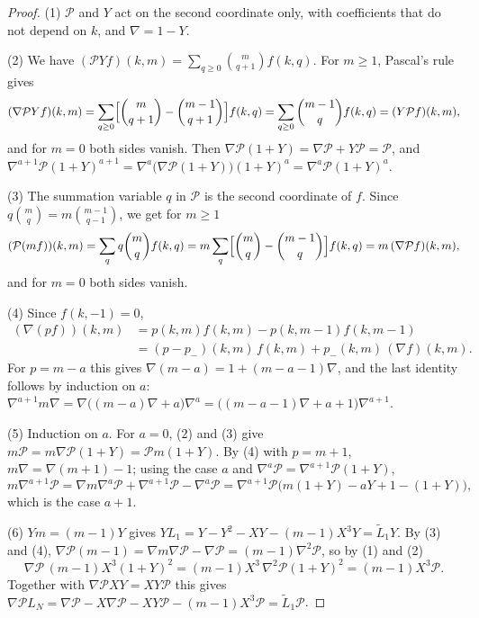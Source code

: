 \documentclass[11pt]{amsart}
\theoremstyle{definition}
\begin{document}
\begin{proof}
(1) $\mathcal P$ and $Y$ act on the second coordinate only, with coefficients that do not depend on $k$, and $\nabla=1-Y$.

(2) We have $(\mathcal PYf)(k,m)=\sum_{q\ge0}\binom{m}{q+1}f(k,q)$. For $m\ge1$, Pascal's rule gives
\[
  (\nabla\mathcal PYf)(k,m)=\sum_{q\ge0}\Bigl[\binom{m}{q+1}-\binom{m-1}{q+1}\Bigr]f(k,q)=\sum_{q\ge0}\binom{m-1}{q}f(k,q)=(Y\mathcal Pf)(k,m),
\]
and for $m=0$ both sides vanish. Then $\nabla\mathcal P(1+Y)=\nabla\mathcal P+Y\mathcal P=\mathcal P$, and $\nabla^{a+1}\mathcal P(1+Y)^{a+1}=\nabla^a\bigl(\nabla\mathcal P(1+Y)\bigr)(1+Y)^a=\nabla^a\mathcal P(1+Y)^a$.

(3) The summation variable $q$ in $\mathcal P$ is the second coordinate of $f$. Since $q\binom{m}{q}=m\binom{m-1}{q-1}$, we get for $m\ge1$
\[
  (\mathcal P(mf))(k,m)=\sum_qq\binom{m}{q}f(k,q)=m\sum_q\Bigl[\binom{m}{q}-\binom{m-1}{q}\Bigr]f(k,q)=m\,(\nabla\mathcal Pf)(k,m),
\]
and for $m=0$ both sides vanish.

(4) Since $f(k,-1)=0$,
\begin{align*}
  (\nabla(pf))(k,m)&=p(k,m)f(k,m)-p(k,m-1)f(k,m-1)\\
  &=(p-p_-)(k,m)\,f(k,m)+p_-(k,m)\,(\nabla f)(k,m).
\end{align*}
For $p=m-a$ this gives $\nabla(m-a)=1+(m-a-1)\nabla$, and the last identity follows by induction on $a$: $\nabla^{a+1}m\nabla=\nabla\bigl((m-a)\nabla+a\bigr)\nabla^a=\bigl((m-a-1)\nabla+a+1\bigr)\nabla^{a+1}$.

(5) Induction on $a$. For $a=0$, (2) and (3) give $m\mathcal P=m\nabla\mathcal P(1+Y)=\mathcal Pm(1+Y)$. By (4) with $p=m+1$, $m\nabla=\nabla(m+1)-1$; using the case $a$ and $\nabla^a\mathcal P=\nabla^{a+1}\mathcal P(1+Y)$,
\[
  m\nabla^{a+1}\mathcal P=\nabla m\nabla^a\mathcal P+\nabla^{a+1}\mathcal P-\nabla^a\mathcal P=\nabla^{a+1}\mathcal P\bigl(m(1+Y)-aY+1-(1+Y)\bigr),
\]
which is the case $a+1$.

(6) $Ym=(m-1)Y$ gives $YL_1=Y-Y^2-XY-(m-1)X^3Y=\widetilde L_1Y$. By (3) and (4), $\nabla\mathcal P(m-1)=\nabla m\nabla\mathcal P-\nabla\mathcal P=(m-1)\nabla^2\mathcal P$, so by (1) and (2)
\[
  \nabla\mathcal P\,(m-1)X^3(1+Y)^2=(m-1)X^3\,\nabla^2\mathcal P(1+Y)^2=(m-1)X^3\mathcal P .
\]
Together with $\nabla\mathcal PXY=XY\mathcal P$ this gives $\nabla\mathcal PL_N=\nabla\mathcal P-X\nabla\mathcal P-XY\mathcal P-(m-1)X^3\mathcal P=\widetilde L_1\mathcal P$.
\end{proof}
\end{document}
